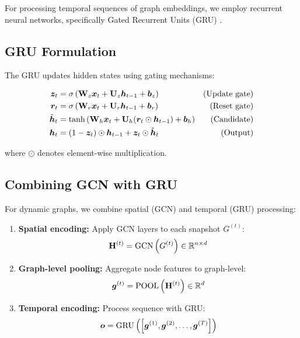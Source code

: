For processing temporal sequences of graph embeddings, we employ recurrent neural networks, specifically Gated Recurrent Units (GRU) \cite{cho2014}.

\subsection{GRU Formulation}

The GRU updates hidden states using gating mechanisms:

\begin{align}
    \bm{z}_t &= \sigma\left(\mathbf{W}_z \bm{x}_t + \mathbf{U}_z \bm{h}_{t-1} + \bm{b}_z\right) & \text{(Update gate)} \\
    \bm{r}_t &= \sigma\left(\mathbf{W}_r \bm{x}_t + \mathbf{U}_r \bm{h}_{t-1} + \bm{b}_r\right) & \text{(Reset gate)} \\
    \tilde{\bm{h}}_t &= \tanh\left(\mathbf{W}_h \bm{x}_t + \mathbf{U}_h (\bm{r}_t \odot \bm{h}_{t-1}) + \bm{b}_h\right) & \text{(Candidate)} \\
    \bm{h}_t &= (1 - \bm{z}_t) \odot \bm{h}_{t-1} + \bm{z}_t \odot \tilde{\bm{h}}_t & \text{(Output)}
\end{align}

where $\odot$ denotes element-wise multiplication.

\subsection{Combining GCN with GRU}

For dynamic graphs, we combine spatial (GCN) and temporal (GRU) processing:

\begin{enumerate}
    \item \textbf{Spatial encoding:} Apply GCN layers to each snapshot $G^{(t)}$:
    \begin{equation}
        \mathbf{H}^{(t)} = \text{GCN}\left(G^{(t)}\right) \in \mathbb{R}^{n \times d}
    \end{equation}
    
    \item \textbf{Graph-level pooling:} Aggregate node features to graph-level:
    \begin{equation}
        \bm{g}^{(t)} = \text{POOL}\left(\mathbf{H}^{(t)}\right) \in \mathbb{R}^{d}
    \end{equation}
    
    \item \textbf{Temporal encoding:} Process sequence with GRU:
    \begin{equation}
        \bm{o} = \text{GRU}\left(\left[\bm{g}^{(1)}, \bm{g}^{(2)}, \ldots, \bm{g}^{(T)}\right]\right)
    \end{equation}
\end{enumerate}

